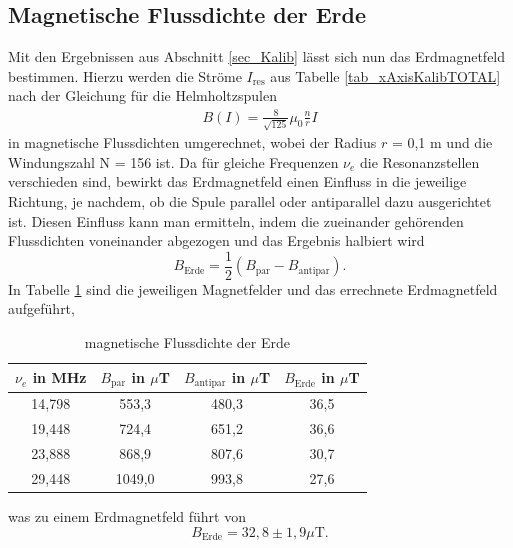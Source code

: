 \subsection{Magnetische Flussdichte der Erde}
Mit den Ergebnissen aus Abschnitt \ref{sec_Kalib} lässt sich nun das Erdmagnetfeld bestimmen. Hierzu werden die Ströme $I_\text{res}$ aus Tabelle
\ref{tab_xAxisKalibTOTAL} nach der Gleichung für die Helmholtzspulen 
\begin{align}
B(I)=\frac{8}{\sqrt{125}} \mu_0 \frac{n}{r}I
\end{align}
in magnetische Flussdichten umgerechnet, wobei der Radius
$r$ = 0,1 m und die Windungszahl N = 156 ist. Da für gleiche Frequenzen $\nu_e$ die Resonanzstellen verschieden sind, bewirkt das Erdmagnetfeld einen
Einfluss in die jeweilige Richtung, je nachdem, ob die Spule parallel oder antiparallel dazu ausgerichtet ist. Diesen Einfluss kann man ermitteln,
indem die zueinander gehörenden Flussdichten voneinander abgezogen und das Ergebnis halbiert wird
\begin{equation}
 B_\text{Erde} = \frac12 ( B_\text{par} - B_\text{antipar}).
\end{equation}
In Tabelle \ref{tab_erdMagnetfeld} sind die jeweiligen Magnetfelder und das errechnete Erdmagnetfeld aufgeführt,
\begin{table}[H]
 \begin{tabular}{c|c|c|c}
 $\nu_e$ in MHz & $B_\text{par}$ in $\mu$T & $B_\text{antipar}$ in $\mu$T& $B_\text{Erde}$ in $\mu$T\\
 \hline
14,798& 553,3 &	480,3&	36,5\\
19,448& 724,4&	651,2&	36,6 \\
23,888& 868,9&	807,6&	30,7\\
29,448& 1049,0&	993,8&	27,6\\
 \end{tabular}
\caption{magnetische Flussdichte der Erde}
\label{tab_erdMagnetfeld}
\end{table}
\noindent was zu einem Erdmagnetfeld führt von 
\begin{equation}
 B_\text{Erde} = 32,8 \pm 1,9 \mu\text{T}.
\end{equation}

\renewcommand{\arraystretch}{1.0}
